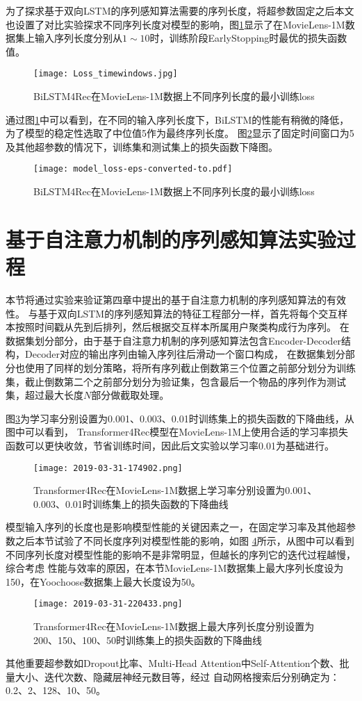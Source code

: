 为了探求基于双向LSTM的序列感知算法需要的序列长度，将超参数固定之后本文也设置了对比实验探求不同序列长度对模型的影响，图\ref{fig:windows}显示了在MovieLens-1M数据集上输入序列长度分别从$1\sim 10$时，训练阶段EarlyStopping时最优的损失函数值。
\begin{figure}[htb]%
  \centering
  \texttt{[image: Loss\_timewindows.jpg]}
  \caption{BiLSTM4Rec在MovieLens-1M数据上不同序列长度的最小训练loss}
  \label{fig:windows}
\end{figure}
通过图\ref{fig:windows}中可以看到，在不同的输入序列长度下，BiLSTM的性能有稍微的降低，为了模型的稳定性选取了中位值5作为最终序列长度。
图\ref{fig:BiLSTMloss}显示了固定时间窗口为5及其他超参数的情况下，训练集和测试集上的损失函数下降图。
\begin{figure}[htb]%
  \centering
  \texttt{[image: model\_loss-eps-converted-to.pdf]}
  \caption{BiLSTM4Rec在MovieLens-1M数据上不同序列长度的最小训练loss}
  \label{fig:BiLSTMloss}
\end{figure}

\section{基于自注意力机制的序列感知算法实验过程}
本节将通过实验来验证第四章中提出的基于自注意力机制的序列感知算法的有效性。
与基于双向LSTM的序列感知算法的特征工程部分一样，首先将每个交互样本按照时间戳从先到后排列，然后根据交互样本所属用户聚类构成行为序列。
在数据集划分部分，由于基于自注意力机制的序列感知算法包含Encoder-Decoder结构，Decoder对应的输出序列由输入序列往后滑动一个窗口构成，
在数据集划分部分也使用了同样的划分策略，将所有序列截止倒数第三个位置之前部分划分为训练集，截止倒数第二个之前部分划分为验证集，包含最后一个物品的序列作为测试集，超过最大长度$N$部分做截取处理。

图\ref{fig:Slefattentionloss}为学习率分别设置为0.001、0.003、0.01时训练集上的损失函数的下降曲线，从图中可以看到，
Transformer4Rec模型在MovieLens-1M上使用合适的学习率损失函数可以更快收敛，节省训练时间，因此后文实验以学习率0.01为基础进行。
\begin{figure}[htb]%
  \centering
  \texttt{[image: 2019-03-31-174902.png]}
  \caption{Transformer4Rec在MovieLens-1M数据上学习率分别设置为0.001、0.003、0.01时训练集上的损失函数的下降曲线}
  \label{fig:Slefattentionloss}
\end{figure}

模型输入序列的长度也是影响模型性能的关键因素之一，在固定学习率及其他超参数之后本节试验了不同长度序列对模型性能的影响，如图
\ref{fig:maxlenloss}所示，从图中可以看到不同序列长度对模型性能的影响不是非常明显，但越长的序列它的迭代过程越慢，综合考虑
性能与效率的原因，在本节MovieLens-1M数据集上最大序列长度设为150，在Yoochoose数据集上最大长度设为50。
\begin{figure}[htb]%
  \centering
  \texttt{[image: 2019-03-31-220433.png]}
  \caption{Transformer4Rec在MovieLens-1M数据上最大序列长度分别设置为200、150、100、50时训练集上的损失函数的下降曲线}
  \label{fig:maxlenloss}
\end{figure}
其他重要超参数如Dropout比率、Multi-Head Attention中Self-Attention个数、批量大小、迭代次数、隐藏层神经元数目等，经过
自动网格搜索后分别确定为：0.2、2、128、10、50。


